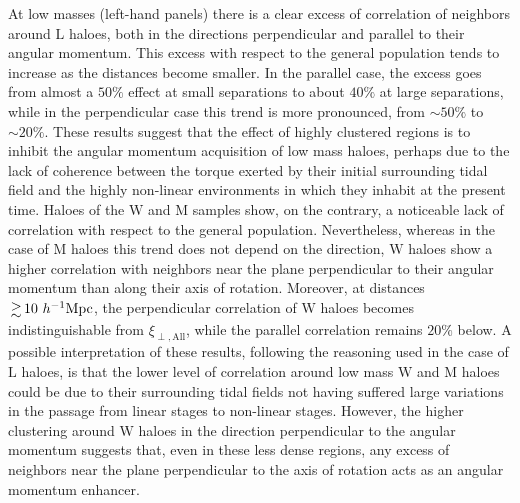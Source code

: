 \documentclass[fleqn,usenatbib]{mnras}
\newcommand{\hMpc}{{\textrm{ $h^{-1}$Mpc}}}
\newcommand{\Wh}{\mathrm{W}}
\newcommand{\Lh}{\mathrm{L}}
\newcommand{\Mh}{\mathrm{M}}
\begin{document}
At low masses (left-hand panels) there is a clear excess of correlation of neighbors around $\Lh$ haloes, both in the directions perpendicular and parallel to their angular momentum. This excess with respect to the general population tends to increase as the distances become smaller. In the parallel case, the excess goes from almost a $50\%$ effect at small separations to about $40\%$ at large separations, while in the perpendicular case this trend is more pronounced, from $\sim 50\%$ to $\sim 20\%$. These results suggest that the effect of highly clustered regions is to inhibit the angular momentum acquisition of low mass haloes, perhaps due to the lack of coherence between the torque exerted by their initial surrounding tidal field and the highly non-linear environments in which they inhabit at the present time. Haloes of the $\Wh$ and $\Mh$ samples show, on the contrary, a noticeable lack of correlation with respect to the general population. Nevertheless, whereas in the case of $\Mh$ haloes this trend does not depend on the direction, $\Wh$ haloes show a higher correlation with neighbors near the plane perpendicular to their angular momentum than along their axis of rotation. Moreover, at distances $\ga 10\hMpc$, the perpendicular correlation of $\Wh$ haloes becomes indistinguishable from $\xi_\mathrm{\perp,All}$, while the parallel correlation remains $20\%$ below. A possible interpretation of these results, following the reasoning used in the case of $\Lh$ haloes, is that the lower level of correlation around low mass $\Wh$ and $\Mh$ haloes could be due to their surrounding tidal fields not having suffered large variations in the passage from linear stages to non-linear stages. However, the higher clustering around $\Wh$ haloes in the direction perpendicular to the angular momentum suggests that, even in these less dense regions, any excess of neighbors near the plane perpendicular to the axis of rotation acts as an angular momentum enhancer.
\end{document}
